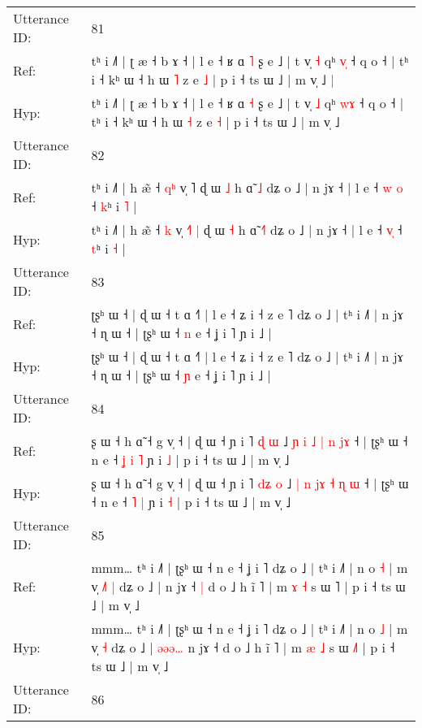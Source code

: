 \documentclass[10pt]{article}
\DeclareRobustCommand{\hl}[1]{{\textcolor{red}{#1}}}
\begin{document}
\begin{longtable}{ll}
 \\
\midrule
Utterance ID: & 81 \\
Ref: & tʰ i ˩˥ | ʈ æ ˧ b ɤ ˧ | l e ˧ ʁ ɑ \hl{˥} ʂ e ˩ | t v̩ \hl{˧} qʰ \hl{v}\hl{̩} ˧ q o ˧ | tʰ i ˧ kʰ ɯ ˧ h ɯ \hl{˥} z e \hl{˩} | p i ˧ ts ɯ ˩ | m v̩ ˩\hl{ }\hl{|}
 \\
Hyp: & tʰ i ˩˥ | ʈ æ ˧ b ɤ ˧ | l e ˧ ʁ ɑ \hl{˧} ʂ e ˩ | t v̩ \hl{˩} qʰ \hl{w}\hl{ɤ} ˧ q o ˧ | tʰ i ˧ kʰ ɯ ˧ h ɯ \hl{˧} z e \hl{˧} | p i ˧ ts ɯ ˩ | m v̩ ˩\hl{}\hl{}
 \\
\midrule
Utterance ID: & 82 \\
Ref: & tʰ i ˩˥ | h æ̃ ˧ \hl{q}\hl{ʰ} v̩ \hl{}˥\hl{}\hl{} ɖ ɯ \hl{˩} h ɑ̃ \hl{}\hl{˩} dʑ o ˩ | n jɤ ˧ | l e ˧ \hl{w}\hl{ }\hl{o} ˧ \hl{k}ʰ i \hl{˥} |
 \\
Hyp: & tʰ i ˩˥ | h æ̃ ˧ \hl{}\hl{k} v̩ \hl{˧}˥\hl{ }\hl{|} ɖ ɯ \hl{˧} h ɑ̃ \hl{˧}\hl{˥} dʑ o ˩ | n jɤ ˧ | l e ˧ \hl{}\hl{v}\hl{̩} ˧ \hl{t}ʰ i \hl{˧} |
 \\
\midrule
Utterance ID: & 83 \\
Ref: & ʈʂʰ ɯ ˧ | ɖ ɯ ˧ t ɑ ˧˥ | l e ˧ ʑ i ˧ z e ˥ dʑ o ˩ | tʰ i ˩˥ | n jɤ ˧ ɳ ɯ ˧ | ʈʂʰ ɯ ˧ \hl{n} e ˧ ʝ i ˥ ɲ i ˩ |
 \\
Hyp: & ʈʂʰ ɯ ˧ | ɖ ɯ ˧ t ɑ ˧˥ | l e ˧ ʑ i ˧ z e ˥ dʑ o ˩ | tʰ i ˩˥ | n jɤ ˧ ɳ ɯ ˧ | ʈʂʰ ɯ ˧ \hl{ɲ} e ˧ ʝ i ˥ ɲ i ˩ |
 \\
\midrule
Utterance ID: & 84 \\
Ref: & ʂ ɯ ˧ h ɑ̃ ˧ g v̩ ˧ | ɖ ɯ ˧ ɲ i ˥ \hl{}\hl{ɖ} \hl{ɯ} ˩ \hl{ɲ} \hl{i} \hl{}\hl{˩} \hl{|} \hl{n} \hl{j}\hl{ɤ} ˧ | ʈʂʰ ɯ ˧ n e ˧\hl{ }\hl{ʝ} \hl{i} \hl{˥} ɲ i \hl{˩} | p i ˧ ts ɯ ˩ | m v̩ ˩
 \\
Hyp: & ʂ ɯ ˧ h ɑ̃ ˧ g v̩ ˧ | ɖ ɯ ˧ ɲ i ˥ \hl{d}\hl{ʑ} \hl{o} ˩ \hl{|} \hl{n} \hl{j}\hl{ɤ} \hl{˧} \hl{ɳ} \hl{}\hl{ɯ} ˧ | ʈʂʰ ɯ ˧ n e ˧\hl{}\hl{} \hl{˥} \hl{|} ɲ i \hl{˧} | p i ˧ ts ɯ ˩ | m v̩ ˩
 \\
\midrule
Utterance ID: & 85 \\
Ref: & mmm… tʰ i ˩˥ | ʈʂʰ ɯ ˧ n e ˧ ʝ i ˥ dʑ o ˩ | tʰ i ˩˥ | n o \hl{˧} | m v̩\hl{ }\hl{˩}\hl{˥} \hl{|} dʑ o ˩ |\hl{}\hl{}\hl{}\hl{}\hl{} n jɤ ˧\hl{ }\hl{|} d o ˩ h ĩ ˥ | m \hl{ɤ} \hl{˧} s ɯ \hl{}˥ | p i ˧ ts ɯ ˩ | m v̩ ˩
 \\
Hyp: & mmm… tʰ i ˩˥ | ʈʂʰ ɯ ˧ n e ˧ ʝ i ˥ dʑ o ˩ | tʰ i ˩˥ | n o \hl{˩} | m v̩\hl{}\hl{}\hl{} \hl{˧} dʑ o ˩ |\hl{ }\hl{ə}\hl{ə}\hl{ə}\hl{…} n jɤ ˧\hl{}\hl{} d o ˩ h ĩ ˥ | m \hl{æ} \hl{˩} s ɯ \hl{˩}˥ | p i ˧ ts ɯ ˩ | m v̩ ˩
 \\
\midrule
Utterance ID: & 86 \\

\end{longtable}
\end{document}
